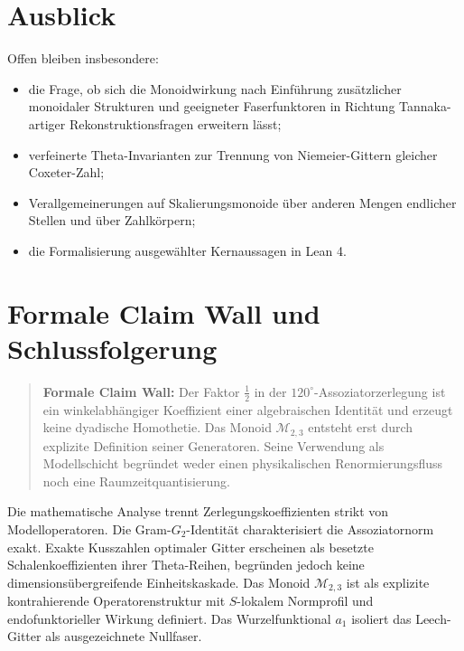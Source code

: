 \documentclass[11pt,a4paper]{article}
\newcommand{\Mmon}{\mathcal{M}_{2,3}}
\begin{document}
\section{Ausblick}
Offen bleiben insbesondere:
\begin{itemize}
  \item die Frage, ob sich die Monoidwirkung nach Einführung zusätzlicher monoidaler Strukturen und geeigneter Faserfunktoren in Richtung Tannaka-artiger Rekonstruktionsfragen erweitern lässt;
  \item verfeinerte Theta-Invarianten zur Trennung von Niemeier-Gittern gleicher Coxeter-Zahl;
  \item Verallgemeinerungen auf Skalierungsmonoide über anderen Mengen endlicher Stellen und über Zahlkörpern;
  \item die Formalisierung ausgewählter Kernaussagen in Lean 4.
\end{itemize}

\section{Formale Claim Wall und Schlussfolgerung}
\begin{quote}
\textbf{Formale Claim Wall:} Der Faktor $\tfrac12$ in der $120^\circ$-Assoziatorzerlegung ist ein winkelabhängiger Koeffizient einer algebraischen Identität und erzeugt keine dyadische Homothetie. Das Monoid $\Mmon$ entsteht erst durch explizite Definition seiner Generatoren. Seine Verwendung als Modellschicht begründet weder einen physikalischen Renormierungsfluss noch eine Raumzeitquantisierung.
\end{quote}

Die mathematische Analyse trennt Zerlegungskoeffizienten strikt von Modelloperatoren. Die Gram-$G_2$-Identität charakterisiert die Assoziatornorm exakt. Exakte Kusszahlen optimaler Gitter erscheinen als besetzte Schalenkoeffizienten ihrer Theta-Reihen, begründen jedoch keine dimensionsübergreifende Einheitskaskade. Das Monoid $\Mmon$ ist als explizite kontrahierende Operatorenstruktur mit $S$-lokalem Normprofil und endofunktorieller Wirkung definiert. Das Wurzelfunktional $a_1$ isoliert das Leech-Gitter als ausgezeichnete Nullfaser.
\end{document}
